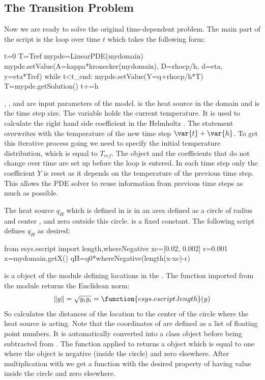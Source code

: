 \subsection{The Transition Problem}
\label{DIFFUSION TRANS SEC}
Now we are ready to solve the original time-dependent problem. The main 
part of the script is the loop over time $t$ which takes the following form:
\begin{python}
  t=0
  T=Tref
  mypde=LinearPDE(mydomain)
  mypde.setValue(A=kappa*kronecker(mydomain), D=rhocp/h, d=eta, y=eta*Tref)
  while t<t_end:
        mypde.setValue(Y=q+rhocp/h*T)
        T=mypde.getSolution()
        t+=h
\end{python}
, ,  and  are input parameters of the model.
 is the heat source in the domain and  is the time step size.
The variable  holds the current temperature.
It is used to calculate the right hand side coefficient  in the
Helmholtz .
The statement  overwrites  with the
temperature of the new time step $\var{t}+\var{h}$.
To get this iterative process going we need to specify the initial temperature
distribution, which is equal to $T_{ref}$.
The \LinearPDE object  and the coefficients that do not change over
time are set up before the loop is entered.
In each time step only the coefficient $Y$ is reset as it depends on the
temperature of the previous time step.
This allows the PDE solver to reuse information from previous time steps as
much as possible.

The heat source $q_H$ which is defined in 
is  in an area defined as a circle of radius  and center
, and zero outside this circle.  is a fixed constant.
The following script defines $q_H$ as desired:
\begin{python}
  from esys.escript import length,whereNegative
  xc=[0.02, 0.002]
  r=0.001
  x=mydomain.getX()
  qH=q0*whereNegative(length(x-xc)-r)
\end{python}
 is a \Data object of the \escript module defining locations in the \Domain {}.
The  function imported from the \escript module returns the 
Euclidean norm:
\begin{equation}\label{DIFFUSION HELM EQ 3aba}
\|y\|=\sqrt{
y_{i}
y_{i}
} = \function{esys.escript.length}(y)
\end{equation}
So  calculates the distances of the location  to the
center of the circle  where the heat source is acting.
Note that the coordinates of  are defined as a list of floating point numbers.
It is automatically converted into a \Data class object before being
subtracted from .
The function  applied to  returns
a \Data object which is equal to one where the object is negative (inside the
circle) and zero elsewhere.
After multiplication with  we get a function with the desired property
of having value  inside the circle and zero elsewhere.

